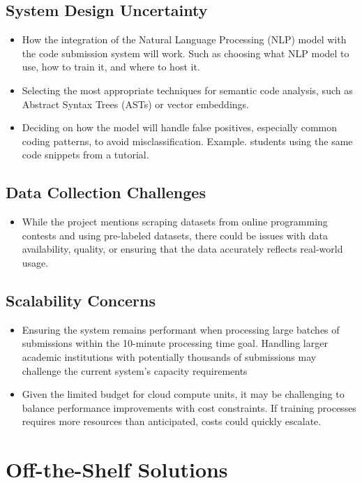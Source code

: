\documentclass[12pt]{article}
\begin{document}
\subsection{System Design Uncertainty}
\begin{itemize}
    \item How the integration of the Natural Language Processing (NLP) model with the code submission system will work. Such as choosing what NLP model to use, how to train it, and where to host it.
    \item Selecting the most appropriate techniques for semantic code analysis, such as Abstract Syntax Trees (ASTs) or vector embeddings.
    \item Deciding on how the model will handle false positives, especially common coding patterns, to avoid misclassification. Example. students using the same code snippets from a tutorial.
\end{itemize}

\subsection {Data Collection Challenges}
\begin{itemize}
    \item While the project mentions scraping datasets from online programming contests and using pre-labeled datasets, 
    there could be issues with data availability, quality, or ensuring that the data accurately reflects real-world usage.
\end{itemize}

\subsection {Scalability Concerns}
\begin{itemize}
    \item Ensuring the system remains performant when processing large batches of submissions within the 10-minute processing time goal. 
    Handling larger academic institutions with potentially thousands of submissions may challenge the current system's capacity requirements
    \item  Given the limited budget for cloud compute units, it may be challenging to balance performance improvements with cost constraints. 
    If training processes requires more resources than anticipated, costs could quickly escalate.
\end{itemize}
\section{Off-the-Shelf Solutions}
\end{document}
